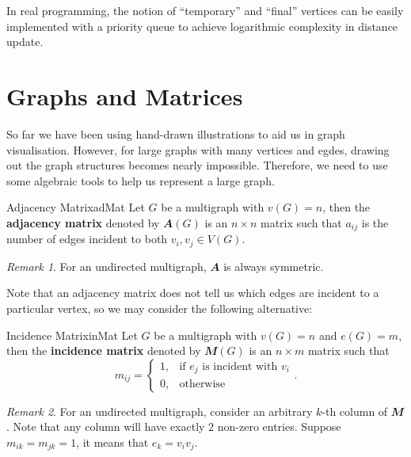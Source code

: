 \documentclass[math]{amznotes}
\theoremstyle{remark}
\newtheorem*{remark}{Remark}
\newcommand{\0}{\mathbf{0}}
\newcommand{\1}{\mathbf{1}}
\begin{document}
In real programming, the notion of ``temporary'' and ``final'' vertices can be easily implemented with a priority queue to achieve logarithmic complexity in distance update.

\section{Graphs and Matrices}
So far we have been using hand-drawn illustrations to aid us in graph visualisation. However, for large graphs with many vertices and egdes, drawing out the graph structures becomes nearly impossible. Therefore, we need to use some algebraic tools to help us represent a large graph.
\begin{dfnbox}{Adjacency Matrix}{adMat}
    Let $G$ be a multigraph with $v(G) = n$, then the {\color{red} \textbf{adjacency matrix}} denoted by $\mathbfit{A}(G)$ is an $n \times n$ matrix such that $a_{ij}$ is the number of edges incident to both $v_i, v_j \in V(G)$.
\end{dfnbox}
\begin{notebox}
    \begin{remark}
        For an undirected multigraph, $\mathbfit{A}$ is always symmetric.
    \end{remark}
\end{notebox}
Note that an adjacency matrix does not tell us which edges are incident to a particular vertex, so we may consider the following alternative:
\begin{dfnbox}{Incidence Matrix}{inMat}
    Let $G$ be a multigraph with $v(G) = n$ and $e(G) = m$, then the {\color{red} \textbf{incidence matrix}} denoted by $\mathbfit{M}(G)$ is an $n \times m$ matrix such that
    \begin{equation*}
        m_{ij} = \begin{cases}
            1, &\textrm{if } e_j \textrm{ is incident with } v_i \\
            0, &\textrm{otherwise}
        \end{cases}.
    \end{equation*}
\end{dfnbox}
\begin{notebox}
    \begin{remark}
        For an undirected multigraph, consider an arbitrary $k$-th column of $\mathbfit{M}$. Note that any column will have exactly $2$ non-zero entries. Suppose $m_{ik} = m_{jk} = 1$, it means that $e_k = v_iv_j$.
    \end{remark}
\end{notebox}
\end{document}
